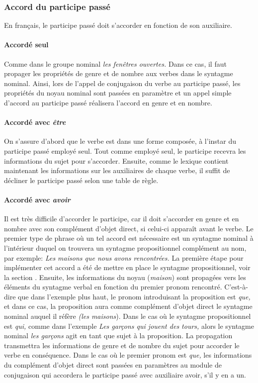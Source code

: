 \documentclass[11pt]{article} %
\begin{document}
\subsubsection{Accord du participe passé}
\label{accordpp}
En français, le participe passé doit s'accorder en fonction de son
auxiliaire. 

\paragraph{Accordé seul}

Comme dans le groupe nominal \emph{les fenêtres ouvertes.} Dans ce cas,
il faut propager les propriétés
de genre et de nombre aux verbes dans le syntagme
nominal. Ainsi, lors de l'appel de conjugaison du verbe
au participe passé, les propriétés du noyau nominal sont passées en
paramètre et un appel simple d'accord au participe passé réalisera
l'accord en genre et en nombre.

\paragraph{Accordé avec \emph{être}}

On s'assure d'abord que le verbe est dans une forme composée,
à l'instar du participe passé employé seul. Tout comme employé seul, le participe
recevra les informations du sujet pour s'accorder. Ensuite, comme le lexique
contient maintenant les informations sur les auxiliaires de chaque
verbe, il suffit de décliner le participe passé selon une table de
règle.

\paragraph{Accordé avec \emph{avoir}}

Il est très difficile d'accorder le participe, car il doit s'accorder en genre et en nombre avec
son complément d'objet direct, si celui-ci apparaît avant le verbe. Le
premier type de phrase où un tel accord est nécessaire est un syntagme
nominal à l'intérieur duquel on trouvera un syntagme propositionnel
complément au nom, par exemple: \emph{Les maisons que nous avons rencontrées.}
La première étape pour implémenter cet accord a été de mettre en place
le syntagme propositionnel, voir la section \hyperref[syntProp]{}.
Ensuite, les informations du noyau (\emph{maison}) sont propagées
vers les éléments du syntagme verbal en fonction du premier pronom
rencontré. C'est-à-dire que dans l'exemple plus haut, le pronom introduisant
la proposition est \emph{que,} et dans ce cas, la proposition aura
comme complément d'objet direct le syntagme nominal auquel il réfère \emph{(les
maisons}). Dans le cas où le syntagme propositionnel
est \emph{qui, }comme dans l'exemple \emph{Les garçons qui jouent
des tours,} alors le syntagme nominal \emph{les garçons }agit en tant
que sujet à la proposition. La propagation transmettra les informations de genre et de nombre
du sujet pour accorder le verbe en conséquence. Dans le cas où le premier pronom est \emph{que,
}les informations du complément d'objet direct sont passées en paramètres
au module de conjugaison qui accordera le participe passé avec auxiliaire
avoir, s'il y en a un.
\end{document}
